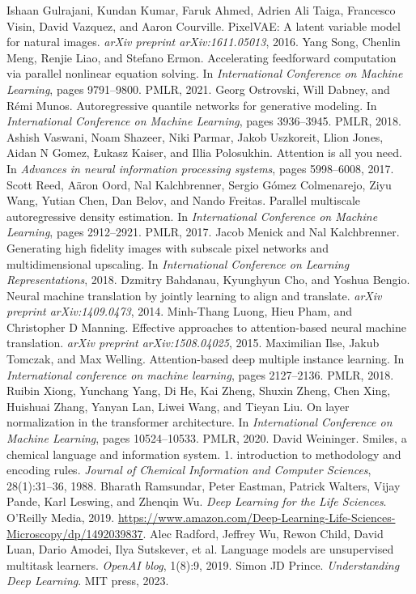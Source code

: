 \begin{chapterreferences}
 Ishaan Gulrajani, Kundan Kumar, Faruk Ahmed, Adrien Ali Taiga, Francesco Visin, David Vazquez, and Aaron Courville. PixelVAE: A latent variable model for natural images. \emph{arXiv preprint arXiv:1611.05013}, 2016.
 Yang Song, Chenlin Meng, Renjie Liao, and Stefano Ermon. Accelerating feedforward computation via parallel nonlinear equation solving. In \emph{International Conference on Machine Learning}, pages 9791--9800. PMLR, 2021.
 Georg Ostrovski, Will Dabney, and Rémi Munos. Autoregressive quantile networks for generative modeling. In \emph{International Conference on Machine Learning}, pages 3936--3945. PMLR, 2018.
 Ashish Vaswani, Noam Shazeer, Niki Parmar, Jakob Uszkoreit, Llion Jones, Aidan N Gomez, Łukasz Kaiser, and Illia Polosukhin. Attention is all you need. In \emph{Advances in neural information processing systems}, pages 5998--6008, 2017.
 Scott Reed, Aäron Oord, Nal Kalchbrenner, Sergio Gómez Colmenarejo, Ziyu Wang, Yutian Chen, Dan Belov, and Nando Freitas. Parallel multiscale autoregressive density estimation. In \emph{International Conference on Machine Learning}, pages 2912--2921. PMLR, 2017.
 Jacob Menick and Nal Kalchbrenner. Generating high fidelity images with subscale pixel networks and multidimensional upscaling. In \emph{International Conference on Learning Representations}, 2018.
 Dzmitry Bahdanau, Kyunghyun Cho, and Yoshua Bengio. Neural machine translation by jointly learning to align and translate. \emph{arXiv preprint arXiv:1409.0473}, 2014.
 Minh-Thang Luong, Hieu Pham, and Christopher D Manning. Effective approaches to attention-based neural machine translation. \emph{arXiv preprint arXiv:1508.04025}, 2015.
 Maximilian Ilse, Jakub Tomczak, and Max Welling. Attention-based deep multiple instance learning. In \emph{International conference on machine learning}, pages 2127--2136. PMLR, 2018.
 Ruibin Xiong, Yunchang Yang, Di He, Kai Zheng, Shuxin Zheng, Chen Xing, Huishuai Zhang, Yanyan Lan, Liwei Wang, and Tieyan Liu. On layer normalization in the transformer architecture. In \emph{International Conference on Machine Learning}, pages 10524--10533. PMLR, 2020.
 David Weininger. Smiles, a chemical language and information system. 1. introduction to methodology and encoding rules. \emph{Journal of Chemical Information and Computer Sciences}, 28(1):31--36, 1988.
 Bharath Ramsundar, Peter Eastman, Patrick Walters, Vijay Pande, Karl Leswing, and Zhenqin Wu. \emph{Deep Learning for the Life Sciences}. O’Reilly Media, 2019. \url{https://www.amazon.com/Deep-Learning-Life-Sciences-Microscopy/dp/1492039837}.
 Alec Radford, Jeffrey Wu, Rewon Child, David Luan, Dario Amodei, Ilya Sutskever, et al. Language models are unsupervised multitask learners. \emph{OpenAI blog}, 1(8):9, 2019.
 Simon JD Prince. \emph{Understanding Deep Learning}. MIT press, 2023.


\end{chapterreferences}
